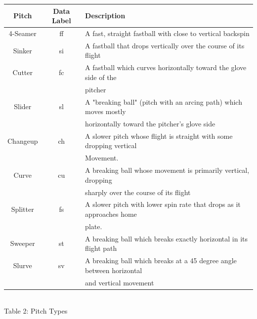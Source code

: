 \documentclass[12 pt]{article}
\begin{document}
\begin{center}
    \begin{tabular}{||c | c | l||} 
     \hline
     Pitch & Data Label & Description  \\ [0.5ex] 
     \hline
     4-Seamer & ff & A fast, straight fastball with close to vertical backspin \\
     \hline
     Sinker & si & A fastball that drops vertically over the course of its flight \\
     \hline
     Cutter & fc & A fastball which curves horizontally toward the glove side of the\\
     && pitcher\\
     \hline
     Slider & sl & A "breaking ball" (pitch with an arcing path) which moves mostly 
     \\ && horizontally toward the pitcher's glove side\\
     \hline
     Changeup & ch & A slower pitch whose flight is straight with some dropping vertical\\ 
     && Movement.\\
     \hline 
     Curve & cu & A breaking ball whose movement is primarily vertical, dropping\\
     && sharply over the course of its flight \\
     \hline 
     Splitter & fs & A slower pitch with lower spin rate that drops as it approaches home \\
     && plate.\\
     \hline
     Sweeper & st & A breaking ball which breaks exactly horizontal in its flight path \\
     \hline 
     Slurve & sv & A breaking ball which breaks at a 45 degree angle between horizontal 
     \\ && and vertical movement \\
     \hline
    \end{tabular}
    \newline \\ Table 2: Pitch Types
\end{center}
\end{document}
